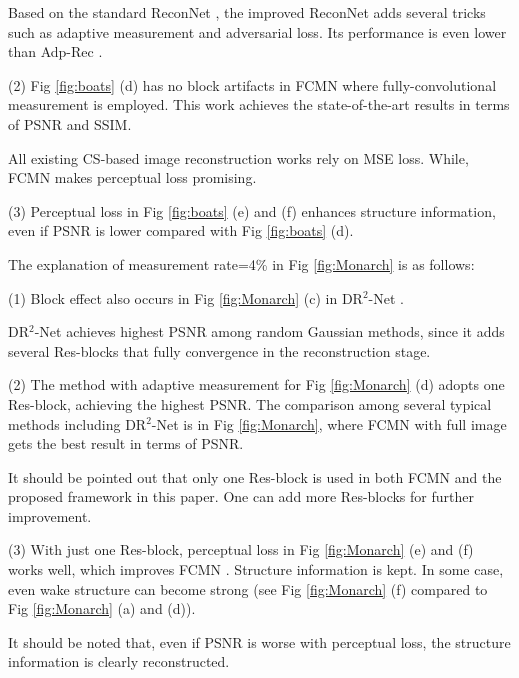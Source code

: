 \documentclass[runningheads]{llncs}
\begin{document}
Based on the standard ReconNet \cite{Kulkarni2016ReconNet}, the improved ReconNet \cite{Lohit2017Convolutional} adds several tricks such as adaptive measurement and adversarial loss. Its performance is even lower than Adp-Rec \cite{Xie2017Adaptive}.

(2)	Fig \ref{fig:boats} (d) has no block artifacts in FCMN \cite{xie2017Fully} where fully-convolutional measurement is employed. This work achieves the state-of-the-art results in terms of PSNR and SSIM.

All existing CS-based image reconstruction works rely on MSE loss. While, FCMN \cite{xie2017Fully} makes perceptual loss promising.

(3)	Perceptual loss in Fig \ref{fig:boats} (e) and (f) enhances structure information, even if PSNR is lower compared with Fig \ref{fig:boats} (d).
\newline

The explanation of measurement rate=4\% in Fig \ref{fig:Monarch} is as follows:

(1)	Block effect also occurs in Fig \ref{fig:Monarch} (c) in DR$^2$-Net \cite{Yao2017DR2}.

DR$^2$-Net achieves highest PSNR among random Gaussian methods, since it adds several Res-blocks that fully convergence in the reconstruction stage.

(2)	The method with adaptive measurement for Fig \ref{fig:Monarch} (d) adopts one Res-block, achieving the highest PSNR. The comparison among several typical methods including DR$^2$-Net is in Fig \ref{fig:Monarch}, where FCMN \cite{xie2017Fully} with full image gets the best result in terms of PSNR.

It should be pointed out that only one Res-block is used in both FCMN \cite{xie2017Fully} and the proposed framework in this paper. One can add more Res-blocks for further improvement.

(3)	With just one Res-block, perceptual loss in Fig \ref{fig:Monarch} (e) and (f) works well, which improves FCMN \cite{xie2017Fully}. Structure information is kept. In some case, even wake structure can become strong (see Fig \ref{fig:Monarch} (f) compared to Fig \ref{fig:Monarch} (a) and (d)).

It should be noted that, even if PSNR is worse with perceptual loss, the structure information is clearly reconstructed.
\end{document}
